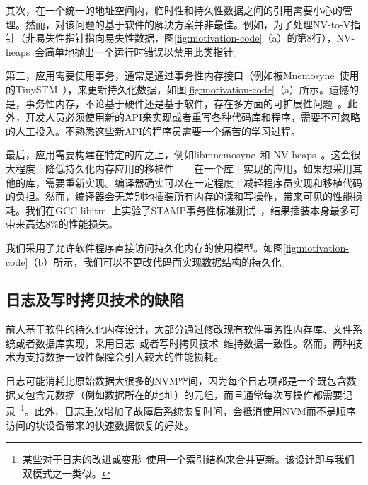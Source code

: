 其次，在一个统一的地址空间内，临时性和持久性数据之间的引用需要小心的管理。然而，对该问题的基于软件的解决方案并非最佳。例如，为了处理NV-to-V指针（非易失性指针指向易失性数据，图\ref{fig:motivation-code}（a）的第8行），NV-heaps~\cite{Coburn:2011:NMP:1950365.1950380}会简单地抛出一个运行时错误以禁用此类指针。

第三，应用需要使用事务，通常是通过事务性内存接口（例如被Mnemosyne~\cite{Volos:2011:MLP:1950365.1950379}使用的TinySTM~\cite{Felber:2008:DPT}），来更新持久化数据，如图\ref{fig:motivation-code}（a）所示。遗憾的是，事务性内存，不论基于硬件还是基于软件，存在多方面的可扩展性问题~\cite{Cascaval:2008:STM:1454456.1454466,Pankratius:2011:STM:1989493.1989500,Dice:2009:EEC:1508244.1508263}。此外，开发人员必须使用新的API来实现或者重写各种代码库和程序，需要不可忽略的人工投入。不熟悉这些新API的程序员需要一个痛苦的学习过程。

最后，应用需要构建在特定的库之上，例如libmnemosyne~\cite{Volos:2011:MLP:1950365.1950379}和
NV-heaps~\cite{Coburn:2011:NMP:1950365.1950380}。这会很大程度上降低持久化内存应用的移植性——在一个库上实现的应用，如果想采用其他的库，需要重新实现。编译器确实可以在一定程度上减轻程序员实现和移植代码的负担。然而，编译器会无差别地插装所有内存的读和写操作，带来可见的性能损耗。我们在GCC libitm~\cite{libitm}上实验了STAMP事务性标准测试~\cite{Cao:2008:STA}，结果插装本身最多可带来高达8\%的性能损失。

我们采用了允许软件程序直接访问持久化内存的使用模型。如图\ref{fig:motivation-code}（b）所示，我们可以不更改代码而实现数据结构的持久化。

\subsection{日志及写时拷贝技术的缺陷}

前人基于软件的持久化内存设计，大部分通过修改现有软件事务性内存库、文件系统或者数据库实现，采用日志~\cite{Volos:2011:MLP:1950365.1950379, Coburn:2011:NMP:1950365.1950380}或者写时拷贝技术~\cite{Condit:2009:BIT:1629575.1629589,
Venkataraman:2011:CDD:1960475.1960480}维持数据一致性。然而，两种技术为支持数据一致性保障会引入较大的性能损耗。

日志可能消耗比原始数据大很多的NVM空间，因为每个日志项都是一个既包含数据又包含元数据（例如数据所在的地址）的元组，而且通常每次写操作都需要记录~\cite{Volos:2011:MLP:1950365.1950379,
Coburn:2011:NMP:1950365.1950380}\footnote{某些对于日志的改进或变形~\cite{1003568}使用一个索引结构来合并更新。该设计即与我们双模式之一类似。}。此外，日志重放增加了故障后系统恢复时间，会抵消使用NVM而不是顺序访问的块设备带来的快速数据恢复的好处。

